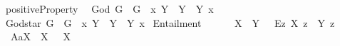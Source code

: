 \begin{isabellebody}
\begin{isamarkuptext}
\end{isamarkuptext}\isamarkuptrue%
\isamarkupfalse%
\ positiveProperty{\isacharcolon}{\isacharcolon}{\isachardoublequoteopen}{\isasymup}{\isasymlangle}{\isasymlangle}{\isasymzero}{\isasymrangle}{\isasymrangle}{\isachardoublequoteclose}\ {\isacharparenleft}{\isachardoublequoteopen}{\isasymP}{\isachardoublequoteclose}{\isacharparenright}\isanewline
{}\isamarkupfalse%
\ God{\isacharcolon}{\isacharcolon}{\isachardoublequoteopen}{\isasymup}{\isasymlangle}{\isasymzero}{\isasymrangle}{\isachardoublequoteclose}\ {\isacharparenleft}{\isachardoublequoteopen}G{\isachardoublequoteclose}{\isacharparenright}\ \ {\isachardoublequoteopen}G\ {\isasymequiv}\ {\isacharparenleft}{\isasymlambda}x{\isachardot}\ \isactrlbold {\isasymforall}Y{\isachardot}\ {\isasymP}\ Y\ \isactrlbold {\isasymrightarrow}\ {\isasymlparr}Y\ x{\isasymrparr}{\isacharparenright}{\isachardoublequoteclose}\isanewline
{}\isamarkupfalse%
\ God{\isacharunderscore}star{\isacharcolon}{\isacharcolon}{\isachardoublequoteopen}{\isasymup}{\isasymlangle}{\isasymzero}{\isasymrangle}{\isachardoublequoteclose}\ {\isacharparenleft}{\isachardoublequoteopen}G{\isacharasterisk}{\isachardoublequoteclose}{\isacharparenright}\ \ {\isachardoublequoteopen}G{\isacharasterisk}\ {\isasymequiv}\ {\isacharparenleft}{\isasymlambda}x{\isachardot}\ \isactrlbold {\isasymforall}Y{\isachardot}\ {\isasymP}\ Y\ \isactrlbold {\isasymleftrightarrow}\ {\isasymlparr}Y\ x{\isasymrparr}{\isacharparenright}{\isachardoublequoteclose}\isanewline
\isanewline
{}\isamarkupfalse%
\ Entailment{\isacharcolon}{\isacharcolon}{\isachardoublequoteopen}{\isasymup}{\isasymlangle}{\isasymlangle}{\isasymzero}{\isasymrangle}{\isacharcomma}{\isasymlangle}{\isasymzero}{\isasymrangle}{\isasymrangle}{\isachardoublequoteclose}\ {\isacharparenleft}\ {\isachardoublequoteopen}{\isasymRrightarrow}{\isachardoublequoteclose}\ {}{}{\isacharparenright}\ \isanewline
\ \ {\isachardoublequoteopen}X\ {\isasymRrightarrow}\ Y\ {\isasymequiv}\ \ \isactrlbold {\isasymbox}{\isacharparenleft}\isactrlbold {\isasymforall}\isactrlsup Ez{\isachardot}\ {\isasymlparr}X\ z{\isasymrparr}\ \isactrlbold {\isasymrightarrow}\ {\isasymlparr}Y\ z{\isasymrparr}{\isacharparenright}{\isachardoublequoteclose}%
\isamarkuptrue%
\isamarkupfalse%
\ \isanewline
\ \ A{}a{\isacharcolon}{\isachardoublequoteopen}{\isasymlfloor}\isactrlbold {\isasymforall}X{\isachardot}\ {\isasymP}\ {\isacharparenleft}{\isasymrightharpoondown}X{\isacharparenright}\ \isactrlbold {\isasymrightarrow}\ \isactrlbold {\isasymnot}{\isacharparenleft}{\isasymP}\ X{\isacharparenright}\ {\isasymrfloor}{\isachardoublequoteclose}\ \ \ \ \ \ \ \ \ %

\end{isabellebody}
